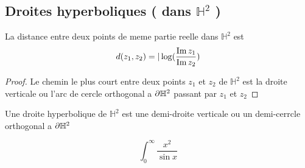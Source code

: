 \documentclass[../main.tex]{subfiles}
\begin{document}
\subsection{Droites hyperboliques ( dans $\mathbb{H}^{2}$ ) }
\begin{lemma}
La distance entre deux points de meme partie reelle dans $ \mathbb{H}^{2}$ est
\[ 
d( z_1,z_2) = | \log ( \frac{\operatorname{Im} z_1}{\operatorname{Im} z_2}) 
\]

\end{lemma}
\begin{proof}
Le chemin le plus court entre deux points $z_1$ et $z_2$ de $ \mathbb{H}^{2}$ est la droite verticale ou l'arc de cercle orthogonal a $ \partial \mathbb{H}^{2}$ passant par $z_1$ et $ z_2$ 
\end{proof}
\begin{defn}
	Une droite hyperbolique de $ \mathbb{H}^{2}$ est une demi-droite verticale ou un demi-cerrcle orthogonal a $\partial \mathbb{H}^{2}$ 
\end{defn}	


\[ 
\int_{ 0 }^{ \infty  } \frac{x^{2}}{\sin x
}
\]
\end{document}
